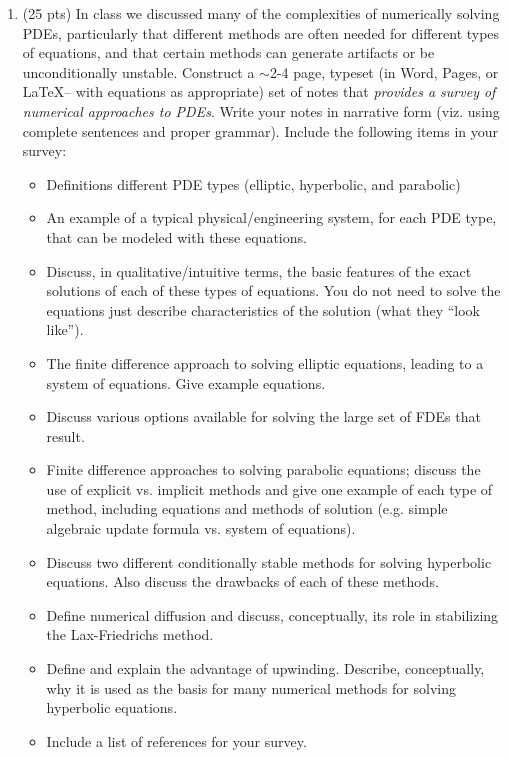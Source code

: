 \documentclass{article}
\begin{document}
\begin{enumerate}
  \item (25 pts) In class we discussed many of the complexities of numerically solving PDEs, particularly that different methods are often needed for different types of equations, and that certain methods can generate artifacts or be unconditionally unstable.  Construct a $\sim$2-4 page, typeset (in Word, Pages, or \LaTeX -- with equations as appropriate) set of notes that \emph{provides a survey of numerical approaches to PDEs}.  Write your notes in narrative form (viz. using complete sentences and proper grammar). Include the following items in your survey:
    \begin{itemize}
      \item Definitions different PDE types (elliptic, hyperbolic, and parabolic)
      \item An example of a typical physical/engineering system, for each PDE type, that can be modeled with these equations.
      \item Discuss, in qualitative/intuitive terms, the basic features of the exact solutions of each of these types of equations.  You do not need to solve the equations just describe characteristics of the solution (what they ``look like'').
      \item The finite difference approach to solving elliptic equations, leading to a system of equations.  Give example equations.  
      \item Discuss various options available for solving the large set of FDEs that result.  
      \item Finite difference approaches to solving parabolic equations; discuss the use of explicit vs. implicit methods and give one example of each type of method, including equations and methods of solution (e.g. simple algebraic update formula vs. system of equations).
      \item Discuss two different conditionally stable methods for solving hyperbolic equations.  Also discuss the drawbacks of each of these methods.  
      \item Define numerical diffusion and discuss, conceptually, its role in stabilizing the Lax-Friedrichs method.  
      \item Define and explain the advantage of upwinding.  Describe, conceptually, why it is used as the basis for many numerical methods for solving hyperbolic equations.  
      \item Include a list of references for your survey.
    \end{itemize}
    

\end{enumerate}
\end{document}
